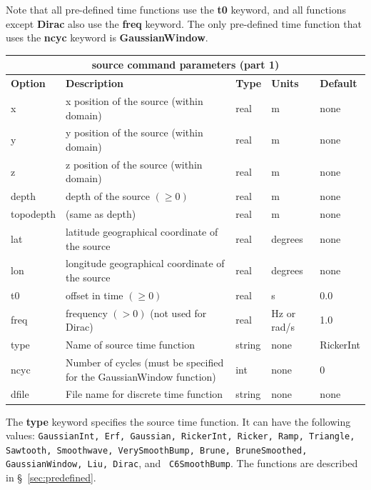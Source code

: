 \documentclass[11pt]{report}
\begin{document}
Note that all pre-defined time functions use the {\bf t0} keyword, and all functions except {\bf
  Dirac} also use the {\bf freq} keyword. The only pre-defined time function that uses the {\bf
  ncyc} keyword is {\bf GaussianWindow}.
%
\begin{center}
\begin{tabular}{|l|p{8cm}|l|l|l|} \hline
\multicolumn{5}{|c|}{\bf source command parameters (part 1)}\\ \hline
\bf{Option} & \bf{Description} & \bf{Type} & \bf{Units} & \bf{Default} \\ \hline \hline
x & x position of the source (within domain) & real & m & none \\ \hline
y & y position of the source (within domain) & real & m & none \\ \hline
z & z position of the source (within domain) & real & m & none \\ \hline
\hline
depth & depth of the source $(\geq 0)$ & real & m & none \\ \hline
topodepth & (same as depth) & real & m & none \\ \hline
lat & latitude geographical coordinate of the source & real & degrees & none \\ \hline
lon & longitude geographical coordinate of the source & real & degrees & none \\ \hline
\hline
t0 & offset in time $(\geq 0)$ & real & s & 0.0 \\ \hline
freq & frequency $(>0)$ (not used for Dirac)& real & Hz or rad/s & 1.0 \\ \hline
type & Name of source time function & string & none & RickerInt \\ \hline
ncyc & Number of cycles (must be specified for the GaussianWindow function) & int & none & 0
\\ \hline
dfile & File name for discrete time function & string & none & none \\ \hline
\end{tabular}
\end{center}
The {\bf type} keyword specifies the source time function. It can have
the following values: {\tt GaussianInt, Erf, Gaussian, RickerInt, Ricker, Ramp, Triangle, Sawtooth,
  Smoothwave, VerySmoothBump, Brune, BruneSmoothed, GaussianWindow, Liu, Dirac}, and {\tt
  C6SmoothBump}. The functions are described in \S~\ref{sec:predefined}.  
\end{document}
